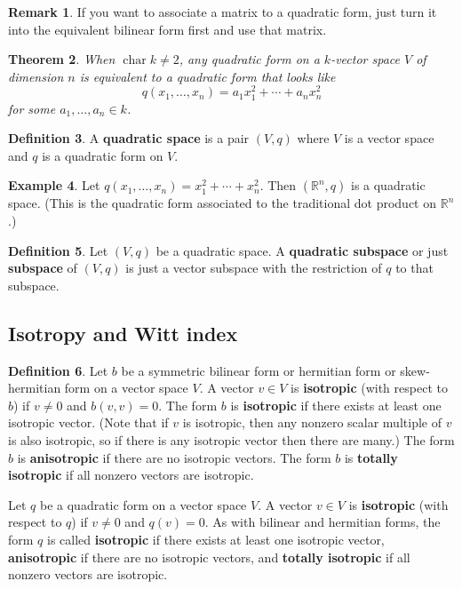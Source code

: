 \documentclass[12pt]{article}
\newtheorem{theorem}{Theorem}
\theoremstyle{definition}
\newtheorem{definition}[theorem]{Definition}
\newtheorem{example}[theorem]{Example}
\newtheorem{remark}[theorem]{Remark}
\newcommand{\R}{\mathbb{R}}
\newcommand{\tbf}{\textbf}
\DeclareMathOperator{\characteristic}{char}
\begin{document}
\begin{remark}
If you want to associate a matrix to a quadratic form, just turn it into the equivalent bilinear form first and use that matrix.
\end{remark}

\begin{theorem}
When $\characteristic k \neq 2$, any quadratic form on a $k$-vector space $V$ of dimension $n$ is equivalent to a quadratic form that looks like
\[
	q(x_1, \ldots, x_n) = a_1 x_1^2 + \cdots + a_n x_n^2
\]
for some $a_1, \ldots, a_n \in k$.
\end{theorem}

\begin{definition}
A \tbf{quadratic space} is a pair $(V,q)$ where $V$ is a vector space and $q$ is a quadratic form on $V$.
\end{definition}

\begin{example}
Let $q(x_1, \ldots, x_n) = x_1^2 + \cdots + x_n^2$. Then $(\R^n, q)$ is a quadratic space. (This is the quadratic form associated to the traditional dot product on $\R^n$.)
\end{example}

\begin{definition}
Let $(V,q)$ be a quadratic space. A \tbf{quadratic subspace} or just \tbf{subspace} of $(V,q)$ is just a vector subspace with the restriction of $q$ to that subspace.
\end{definition}

\subsection{Isotropy and Witt index}

\begin{definition}
Let $b$ be a symmetric bilinear form or hermitian form or skew-hermitian form on a vector space $V$. A vector $v \in V$ is \tbf{isotropic} (with respect to $b$) if $v \neq 0$ and $b(v,v) = 0$. The form $b$ is \tbf{isotropic} if there exists at least one isotropic vector. (Note that if $v$ is isotropic, then any nonzero scalar multiple of $v$ is also isotropic, so if there is any isotropic vector then there are many.) The form $b$ is \tbf{anisotropic} if there are no isotropic vectors.  The form $b$ is \tbf{totally isotropic} if all nonzero vectors are isotropic.

Let $q$ be a quadratic form on a vector space $V$. A vector $v \in V$ is \tbf{isotropic} (with respect to $q$) if $v \neq 0$ and $q(v) = 0$. As with bilinear and hermitian forms, the form $q$ is called \tbf{isotropic} if there exists at least one isotropic vector, \tbf{anisotropic} if there are no isotropic vectors, and \tbf{totally isotropic} if all nonzero vectors are isotropic.
\end{definition}
\end{document}
